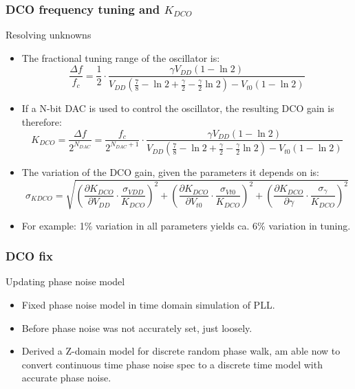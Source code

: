 \documentclass[t, screen, aspectratio=43]{beamer}
\begin{document}
\begin{frame}
	\frametitle{DCO frequency tuning and $K_{DCO}$}
	\begin{block}{Resolving unknowns}
		\begin{itemize}
			\scriptsize
			\item The fractional tuning range of the oscillator is:
			\tiny
	\begin{equation}
		\frac{\Delta f}{f_c} = \frac{1}{2}\cdot\frac{\gamma V_{DD}\left( 1-\ln2 \right)}{V_{DD}\left(\frac{7}{8}-\ln2+\frac{\gamma}{2}-\frac{\gamma}{2}\ln2\right)-V_{t0}\left(1-\ln2\right)}
	\end{equation}	
			\scriptsize
			\item If a N-bit DAC is used to control the oscillator, the resulting DCO gain is therefore:
			\tiny
	\begin{equation}
		K_{DCO} = \frac{\Delta f}{2^{N_{DAC}}} = \frac{f_c}{2^{N_{DAC}+1}}\cdot\frac{\gamma V_{DD}\left( 1-\ln2 \right)}{V_{DD}\left(\frac{7}{8}-\ln2+\frac{\gamma}{2}-\frac{\gamma}{2}\ln2\right)-V_{t0}\left(1-\ln2\right)}
	\end{equation}	
			\scriptsize
			\item The variation of the DCO gain, given the parameters it depends on is:
			\tiny
	\begin{equation}
		\sigma_{KDCO} = \sqrt{\left(\frac{\partial K_{DCO}}{\partial V_{DD}}\cdot\frac{\sigma_{VDD}}{K_{DCO}} \right)^2 + \left(\frac{\partial K_{DCO}}{\partial V_{t0}}\cdot\frac{\sigma_{Vt0}}{K_{DCO}} \right)^2 + \left(\frac{\partial K_{DCO}}{\partial \gamma}\cdot\frac{\sigma_\gamma}{K_{DCO}} \right)^2}
	\end{equation}
			\scriptsize
			\item For example: 1\% variation in all parameters yields ca. 6\% variation in tuning.
		\end{itemize} 	
	\end{block}
\end{frame}

\begin{frame}
	\frametitle{DCO fix}
	\begin{block}{Updating phase noise model}
		\begin{itemize}
			\scriptsize
			\item Fixed phase noise model in time domain simulation of PLL.
			\item Before phase noise was not accurately set, just loosely.
			\item Derived a Z-domain model for discrete random phase walk, am able now to convert continuous time phase noise spec to a discrete time model with accurate phase noise.
		\end{itemize} 	
	\end{block}
\end{frame}
\end{document}
